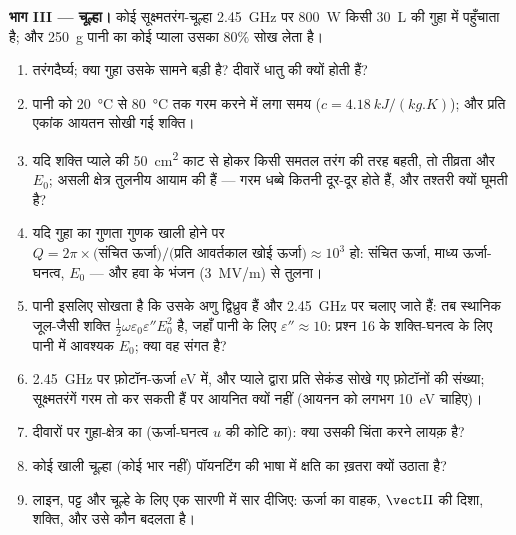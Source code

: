 \begin{problem}[{सप्ताहांत समस्या --- विद्युत्चुंबकीय ऊर्जा का पीछा:
किसी विद्युत-लाइन से किसी घर तक, सूर्य से किसी सौर पट्ट तक,
और किसी मैग्नेट्रॉन से पानी के किसी प्याले तक}]
\medskip
\noindent\textbf{भाग III --- चूल्हा।}
कोई सूक्ष्मतरंग-चूल्हा \qty{2.45}{GHz} पर \qty{800}{W} किसी \qty{30}{L} की गुहा में
पहुँचाता है; और \qty{250}{g} पानी का कोई प्याला उसका $80\%$ सोख लेता है।
\begin{enumerate}[resume]
  \item तरंगदैर्घ्य; क्या गुहा उसके सामने बड़ी है? दीवारें धातु की
        क्यों होती हैं?
  \item पानी को \qty{20}{\degreeCelsius} से \qty{80}{\degreeCelsius} तक गरम करने में लगा समय
        ($c = \qty{4.18}{kJ/(kg.K)}$); और प्रति एकांक आयतन सोखी गई शक्ति।
  \item यदि शक्ति प्याले की \qty{50}{cm^2} काट से होकर किसी समतल तरंग की
        तरह बहती, तो तीव्रता और $E_0$; असली क्षेत्र
        तुलनीय आयाम की  हैं --- गरम धब्बे कितनी दूर-दूर
        होते हैं, और तश्तरी क्यों घूमती है?
  \item यदि गुहा का गुणता गुणक खाली होने पर
        $Q = 2\pi\times\text{(संचित ऊर्जा)}/\text{(प्रति आवर्तकाल खोई ऊर्जा)}
        \approx 10^3$ हो: संचित ऊर्जा, माध्य ऊर्जा-घनत्व, $E_0$
        --- और हवा के भंजन (\qty{3}{MV/m}) से तुलना।
  \item पानी इसलिए सोखता है कि उसके अणु द्विध्रुव हैं और
        \qty{2.45}{GHz} पर चलाए जाते हैं: तब स्थानिक जूल-जैसी शक्ति $\tfrac12\omega\varepsilon_0
        \varepsilon''E_0^2$ है, जहाँ पानी के लिए $\varepsilon'' \approx 10$: प्रश्न 16 के
        शक्ति-घनत्व के लिए पानी में आवश्यक $E_0$; क्या वह संगत है?
  \item \qty{2.45}{GHz} पर फ़ोटॉन-ऊर्जा eV में, और प्याले द्वारा प्रति सेकंड
        सोखे गए फ़ोटॉनों की संख्या; सूक्ष्मतरंगें गरम तो कर सकती हैं पर
        आयनित क्यों नहीं (आयनन को लगभग \qty{10}{eV} चाहिए)।
  \item दीवारों पर गुहा-क्षेत्र का  (ऊर्जा-घनत्व $u$ की
        कोटि का): क्या उसकी चिंता करने लायक़ है?
  \item कोई खाली चूल्हा (कोई भार नहीं) पॉयनटिंग की भाषा में
        क्षति का ख़तरा क्यों उठाता है?
  \item लाइन, पट्ट और चूल्हे के लिए एक सारणी में सार दीजिए: ऊर्जा का
        वाहक, $\vect\Pi$ की दिशा, शक्ति, और उसे कौन
        बदलता है।
\end{enumerate}
\end{problem}

